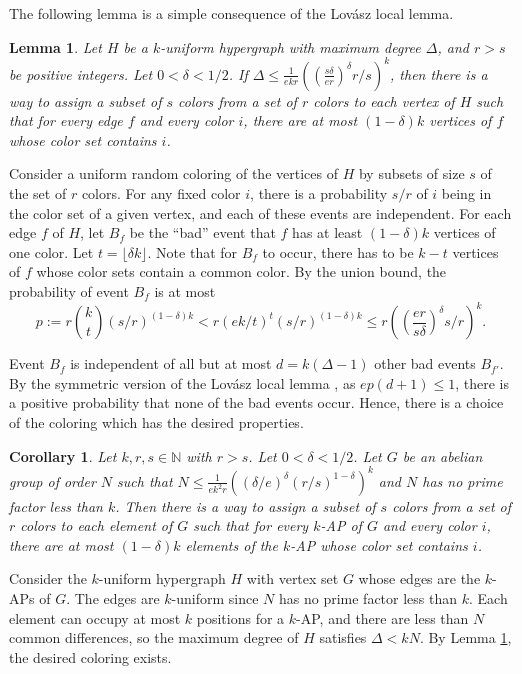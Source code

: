 \documentclass[11pt]{article}
\makeatletter
\numberwithin{equation}{section}
\renewenvironment{proof}[1][\proofname]{\par
  \vspace{-\topsep}%
  \pushQED{\qed}%
  \normalfont
  \topsep0pt \partopsep0pt %
  \trivlist
  \item[\hskip\labelsep
        \itshape
    #1\@addpunct{.}]\ignorespaces
}{%
  \popQED\endtrivlist\@endpefalse
  \addvspace{6pt plus 6pt} %
}
\newtheorem{lem}[result]{Lemma}
\newtheorem{cor}[result]{Corollary}
\theoremstyle{definition}
\theoremstyle{remark}
\makeatother
\begin{document}
The following lemma is a simple consequence of the Lov\'asz local lemma. 

\begin{lem}\label{lllconsequence}
Let $H$ be a $k$-uniform hypergraph with maximum degree $\Delta$, and  $r > s$ be positive integers. Let $0<\delta <1/2$. If $\Delta \leq \frac{1}{ekr}\left(\left(\frac{s\delta}{er}\right)^{\delta}r/s\right)^{k}$, then there is a way to assign a subset of $s$ colors from a set of $r$ colors to each vertex of $H$ such that for every edge $f$ and every color $i$, there are at most $(1-\delta)k$ vertices of $f$ whose color set contains $i$. 
\end{lem}
\begin{proof}
Consider a uniform random coloring of the vertices of $H$ by subsets of size $s$ of the set of $r$ colors. For any fixed color $i$, there is a probability $s/r$ of $i$ being in the color set of a given vertex, and each of these events are independent. For each edge $f$ of $H$, let $B_f$ be the ``bad'' event that $f$ has at least $(1-\delta)k$ vertices of one color. Let $t= \lfloor \delta k \rfloor$. Note that for $B_f$ to occur, there has to be $k-t$ vertices of $f$ whose color sets contain a common color. By the union bound, the probability of event $B_f$ is at most $$p:=r{k \choose t}(s/r)^{(1-\delta)k} < r(ek/t)^t(s/r)^{(1-\delta)k} \leq r\left(\left(\frac{er}{s\delta}\right)^{\delta}s/r\right)^{k}.$$ 

Event $B_f$ is independent of all but at most $d=k(\Delta-1)$ other bad events $B_{f'}$. By the symmetric version of the Lov\'asz local lemma \cite{Spencer77}, as $ep(d+1) \leq 1$, there is a positive probability that none of the bad events occur. Hence, there is a choice of the coloring which has the desired properties. 
\end{proof}



\begin{cor}\label{lllcor} Let $k,r,s \in \mathbb{N}$ with $r>s$. Let $0<\delta <1/2$. Let $G$ be an abelian group of order $N$ such that $N \leq \frac{1}{ek^2r}\left(\left(\delta/e\right)^{\delta}\left(r/s\right)^{1-\delta}\right)^{k}$ and $N$ has no prime factor less than $k$. Then there is a way to assign a subset of $s$ colors from a set of $r$ colors to each element of $G$ such that for every $k$-AP of $G$ and every color $i$, there are at most $(1-\delta)k$ elements of the $k$-AP whose color set contains $i$. 
\end{cor}
\begin{proof}
Consider the $k$-uniform hypergraph $H$ with vertex set $G$ whose edges are the $k$-APs of $G$. The edges are $k$-uniform since $N$ has no prime factor less than $k$. Each element can occupy at most $k$ positions for a $k$-AP, and there are less than $N$ common differences, so the maximum degree of $H$ satisfies $\Delta <kN$. By Lemma \ref{lllconsequence}, the desired coloring exists. 
\end{proof}
\end{document}

